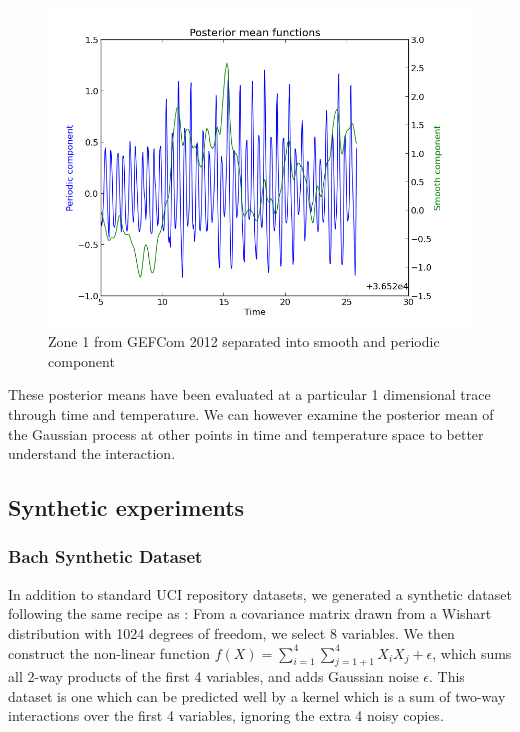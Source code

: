\documentclass[twoside]{article}
\begin{document}
\begin{figure}
\includegraphics[width=\columnwidth]{../figures/gef_load_z01_500_posteriors}
\caption{Zone 1 from GEFCom 2012 separated into smooth and periodic component}
\label{fig:gef_z01_two_means}
\end{figure}

These posterior means have been evaluated at a particular 1 dimensional trace through time and temperature.
We can however examine the posterior mean of the Gaussian process at other points in time and temperature space to better understand the interaction.


\subsection{Synthetic experiments}

\subsubsection{Bach Synthetic Dataset}
In addition to standard UCI repository datasets, we generated a synthetic dataset following the same recipe as \cite{DBLP:journals/corr/abs-0909-0844}: From a covariance matrix drawn from a Wishart distribution with 1024 degrees of freedom, we select 8 variables.  We then construct the non-linear function $f(X) = \sum_{i=1}^4 \sum_{j=1+1}^4 X_i X_j + \epsilon$, which sums all 2-way products of the first 4 variables, and adds Gaussian noise $\epsilon$.  This dataset is one which can be predicted well by a kernel which is a sum of two-way interactions over the first 4 variables, ignoring the extra 4 noisy copies.
\end{document}
